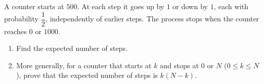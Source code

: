 A counter starts at $500$. At each step it goes up by $1$ or down by $1$, each with probability $\dfrac12$, independently of earlier steps. The process stops when the counter reaches $0$ or $1000$.
\begin{enumerate}
\item[(a)] Find the expected number of steps.
\item[(b)] More generally, for a counter that starts at $k$ and stops at $0$ or $N$ ($0\le k\le N$), prove that the expected number of steps is $k(N-k)$.
\end{enumerate}
